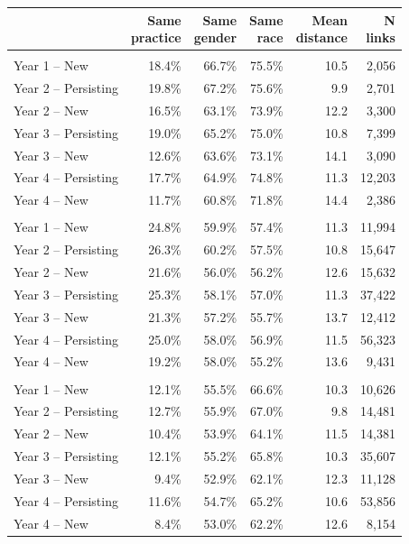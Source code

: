 \begin{tabular}{lrrrrr}
\toprule
  & \shortstack[r]{Same \\ practice} & \shortstack[r]{Same \\ gender} & \shortstack[r]{Same \\ race} & \shortstack[r]{Mean \\ distance} & \shortstack[r]{N \\ links}\\
\midrule
\addlinespace[0.5em]
\multicolumn{6}{l}{\textbf{Orthopedic Surgery}}\\
Year 1 -- New & 18.4\% & 66.7\% & 75.5\% & 10.5 & 2,056\\
Year 2 -- Persisting & 19.8\% & 67.2\% & 75.6\% & 9.9 & 2,701\\
Year 2 -- New & 16.5\% & 63.1\% & 73.9\% & 12.2 & 3,300\\
Year 3 -- Persisting & 19.0\% & 65.2\% & 75.0\% & 10.8 & 7,399\\
Year 3 -- New & 12.6\% & 63.6\% & 73.1\% & 14.1 & 3,090\\
Year 4 -- Persisting & 17.7\% & 64.9\% & 74.8\% & 11.3 & 12,203\\
Year 4 -- New & 11.7\% & 60.8\% & 71.8\% & 14.4 & 2,386\\
\addlinespace[0.5em]
\multicolumn{6}{l}{\textbf{Cardiology}}\\
Year 1 -- New & 24.8\% & 59.9\% & 57.4\% & 11.3 & 11,994\\
Year 2 -- Persisting & 26.3\% & 60.2\% & 57.5\% & 10.8 & 15,647\\
Year 2 -- New & 21.6\% & 56.0\% & 56.2\% & 12.6 & 15,632\\
Year 3 -- Persisting & 25.3\% & 58.1\% & 57.0\% & 11.3 & 37,422\\
Year 3 -- New & 21.3\% & 57.2\% & 55.7\% & 13.7 & 12,412\\
Year 4 -- Persisting & 25.0\% & 58.0\% & 56.9\% & 11.5 & 56,323\\
Year 4 -- New & 19.2\% & 58.0\% & 55.2\% & 13.6 & 9,431\\
\addlinespace[0.5em]
\multicolumn{6}{l}{\textbf{Dermatology}}\\
Year 1 -- New & 12.1\% & 55.5\% & 66.6\% & 10.3 & 10,626\\
Year 2 -- Persisting & 12.7\% & 55.9\% & 67.0\% & 9.8 & 14,481\\
Year 2 -- New & 10.4\% & 53.9\% & 64.1\% & 11.5 & 14,381\\
Year 3 -- Persisting & 12.1\% & 55.2\% & 65.8\% & 10.3 & 35,607\\
Year 3 -- New & 9.4\% & 52.9\% & 62.1\% & 12.3 & 11,128\\
Year 4 -- Persisting & 11.6\% & 54.7\% & 65.2\% & 10.6 & 53,856\\
Year 4 -- New & 8.4\% & 53.0\% & 62.2\% & 12.6 & 8,154\\
\bottomrule
\end{tabular}
